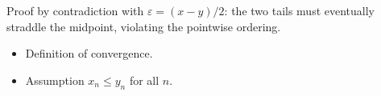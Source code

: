\begin{remark*}
Proof by contradiction with $\varepsilon = (x - y)/2$: the two tails must
eventually straddle the midpoint, violating the pointwise ordering.
\end{remark*}

\begin{remark*}[Dependencies]
\begin{itemize}
  \item Definition of convergence.
  \item Assumption $x_n \le y_n$ for all $n$.
\end{itemize}
\end{remark*}

